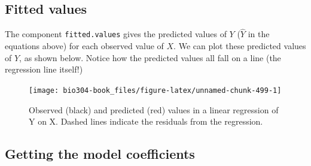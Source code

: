 \documentclass[]{book}
\newenvironment{Shaded}{\begin{snugshade}}{\end{snugshade}}
\newcommand{\CommentTok}[1]{\textcolor[rgb]{0.56,0.35,0.01}{\textit{#1}}}
\newcommand{\DataTypeTok}[1]{\textcolor[rgb]{0.13,0.29,0.53}{#1}}
\newcommand{\FloatTok}[1]{\textcolor[rgb]{0.00,0.00,0.81}{#1}}
\newcommand{\KeywordTok}[1]{\textcolor[rgb]{0.13,0.29,0.53}{\textbf{#1}}}
\newcommand{\NormalTok}[1]{#1}
\newcommand{\OperatorTok}[1]{\textcolor[rgb]{0.81,0.36,0.00}{\textbf{#1}}}
\newcommand{\StringTok}[1]{\textcolor[rgb]{0.31,0.60,0.02}{#1}}
\theoremstyle{definition}
\theoremstyle{definition}
\theoremstyle{definition}
\theoremstyle{remark}
\begin{document}
\hypertarget{fitted-values}{%
\subsection{Fitted values}\label{fitted-values}}

The component \texttt{fitted.values} gives the predicted values of \(Y\)
(\(\hat{Y}\) in the equations above) for each observed value of \(X\).
We can plot these predicted values of \(Y\), as shown below. Notice how
the predicted values all fall on a line (the regression line itself!)

\begin{Shaded}
\end{Shaded}

\begin{figure}

{\centering \texttt{[image: bio304-book\_files/figure-latex/unnamed-chunk-499-1]} 

}

\caption{Observed (black) and predicted (red) values in a linear regression of Y on X.  Dashed lines indicate the residuals from the regression.}\label{fig:unnamed-chunk-499}
\end{figure}

\hypertarget{getting-the-model-coefficients}{%
\subsection{Getting the model
coefficients}\label{getting-the-model-coefficients}}
\end{document}
